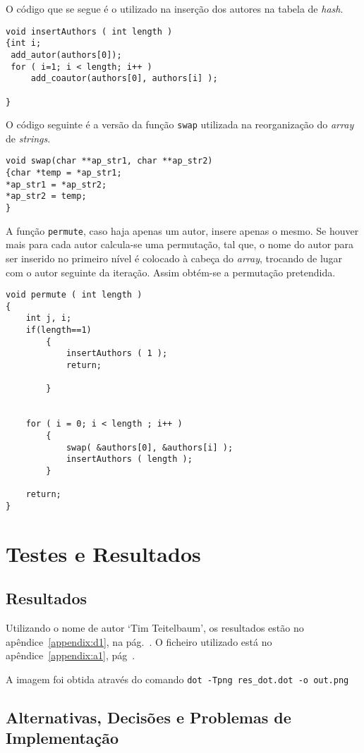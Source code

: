 O código que se segue é o utilizado na inserção dos autores na tabela de
\emph{hash}. 

\begin{Verbatim}
void insertAuthors ( int length )
{int i;
 add_autor(authors[0]);
 for ( i=1; i < length; i++ )
     add_coautor(authors[0], authors[i] );
 				
}
\end{Verbatim}

O código seguinte é a versão da função \texttt{swap} utilizada na reorganização
do \emph{array} de \emph{strings}. 
\begin{Verbatim}
void swap(char **ap_str1, char **ap_str2)
{char *temp = *ap_str1;
*ap_str1 = *ap_str2;
*ap_str2 = temp;
}
\end{Verbatim}

A função \texttt{permute}, caso haja apenas um autor, insere apenas o mesmo. Se
houver mais para cada autor calcula-se uma permutação, tal que, o nome do autor
para ser inserido no primeiro nível é colocado à cabeça do \emph{array},
trocando de lugar com o autor seguinte da iteração. Assim obtém-se a permutação
pretendida.
\begin{Verbatim}
void permute ( int length )
{
    int j, i;
    if(length==1)
        {
            insertAuthors ( 1 );
            return;

        }


    for ( i = 0; i < length ; i++ )
        {
            swap( &authors[0], &authors[i] );
            insertAuthors ( length );
        }

    return;
}
\end{Verbatim}

\section{Testes e Resultados}
\label{sec:ts:c}


\subsection{Resultados}

Utilizando o nome de autor `Tim Teitelbaum', os resultados estão no
apêndice~\ref{appendix:d1}, na pág.~\pageref{appendix:d1}. O ficheiro
 utilizado está no apêndice~\ref{appendix:a1},
pág~\pageref{listing:a2}.

A imagem foi obtida através do comando \verb|dot -Tpng res_dot.dot -o out.png| 


\subsection{Alternativas, Decisões e Problemas de Implementação}

